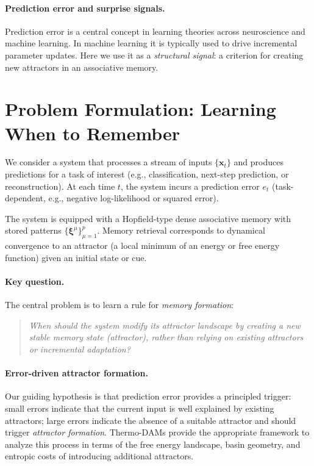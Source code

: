 \documentclass[11pt,a4paper]{article}
\begin{document}
\paragraph{Prediction error and surprise signals.}
Prediction error is a central concept in learning theories across neuroscience and machine learning.
In machine learning it is typically used to drive incremental parameter updates.
Here we use it as a \emph{structural signal}: a criterion for creating new attractors in an associative memory.

\section{Problem Formulation: Learning When to Remember}

We consider a system that processes a stream of inputs $\{\bm{x}_t\}$ and produces predictions for a task of interest (e.g., classification, next-step prediction, or reconstruction).
At each time $t$, the system incurs a prediction error $e_t$ (task-dependent, e.g., negative log-likelihood or squared error).

The system is equipped with a Hopfield-type dense associative memory with stored patterns $\{\bm{\xi}^\mu\}_{\mu=1}^p$.
Memory retrieval corresponds to dynamical convergence to an attractor (a local minimum of an energy or free energy function) given an initial state or cue.

\paragraph{Key question.}
The central problem is to learn a rule for \emph{memory formation}:
\begin{quote}
\emph{When should the system modify its attractor landscape by creating a new stable memory state (attractor), rather than relying on existing attractors or incremental adaptation?}
\end{quote}

\paragraph{Error-driven attractor formation.}
Our guiding hypothesis is that prediction error provides a principled trigger:
small errors indicate that the current input is well explained by existing attractors;
large errors indicate the absence of a suitable attractor and should trigger \emph{attractor formation}.
Thermo-DAMs provide the appropriate framework to analyze this process in terms of the free energy landscape, basin geometry, and entropic costs of introducing additional attractors.
\end{document}
